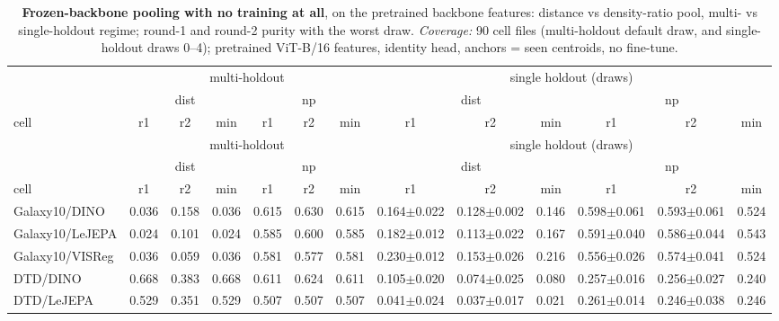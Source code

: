 \begin{landscape}
\begin{center}
\footnotesize
\setlength{\tabcolsep}{3pt}
\begin{longtable}{lcccccccccccc}
\caption{\textbf{Frozen-backbone pooling with no training at all}, on the pretrained backbone features: distance vs density-ratio pool, multi- vs single-holdout regime; round-1 and round-2 purity with the worst draw. \emph{Coverage:} 90 cell files (multi-holdout default draw, and single-holdout draws 0--4); pretrained ViT-B/16 features, identity head, anchors = seen centroids, no fine-tune.}\label{tab:app_frozen_np}\\
\toprule
& \multicolumn{6}{c}{multi-holdout} & \multicolumn{6}{c}{single holdout (draws)} \\
\cmidrule(lr){2-7}\cmidrule(lr){8-13}
& \multicolumn{3}{c}{dist} & \multicolumn{3}{c}{np} & \multicolumn{3}{c}{dist} & \multicolumn{3}{c}{np} \\
cell & r1 & r2 & min & r1 & r2 & min & r1 & r2 & min & r1 & r2 & min \\
\midrule
\endfirsthead
\toprule
& \multicolumn{6}{c}{multi-holdout} & \multicolumn{6}{c}{single holdout (draws)} \\
\cmidrule(lr){2-7}\cmidrule(lr){8-13}
& \multicolumn{3}{c}{dist} & \multicolumn{3}{c}{np} & \multicolumn{3}{c}{dist} & \multicolumn{3}{c}{np} \\
cell & r1 & r2 & min & r1 & r2 & min & r1 & r2 & min & r1 & r2 & min \\
\midrule
\endhead
\bottomrule
\endfoot
Galaxy10/DINO & 0.036 & 0.158 & 0.036 & 0.615 & 0.630 & 0.615 & 0.164$\pm$0.022 & 0.128$\pm$0.002 & 0.146 & 0.598$\pm$0.061 & 0.593$\pm$0.061 & 0.524 \\
Galaxy10/LeJEPA & 0.024 & 0.101 & 0.024 & 0.585 & 0.600 & 0.585 & 0.182$\pm$0.012 & 0.113$\pm$0.022 & 0.167 & 0.591$\pm$0.040 & 0.586$\pm$0.044 & 0.543 \\
Galaxy10/VISReg & 0.036 & 0.059 & 0.036 & 0.581 & 0.577 & 0.581 & 0.230$\pm$0.012 & 0.153$\pm$0.026 & 0.216 & 0.556$\pm$0.026 & 0.574$\pm$0.041 & 0.524 \\
DTD/DINO & 0.668 & 0.383 & 0.668 & 0.611 & 0.624 & 0.611 & 0.105$\pm$0.020 & 0.074$\pm$0.025 & 0.080 & 0.257$\pm$0.016 & 0.256$\pm$0.027 & 0.240 \\
DTD/LeJEPA & 0.529 & 0.351 & 0.529 & 0.507 & 0.507 & 0.507 & 0.041$\pm$0.024 & 0.037$\pm$0.017 & 0.021 & 0.261$\pm$0.014 & 0.246$\pm$0.038 & 0.246 \\

\end{longtable}
\end{center}
\end{landscape}

